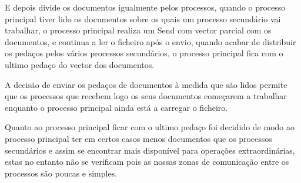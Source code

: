 \documentclass[times, 10pt,twocolumn]{article}
\begin{document}
E depois divide os documentos igualmente pelos processos, quando o processo principal tiver lido os documentos sobre os quais um processo secundário vai trabalhar, o processo principal realiza um Send com vector parcial com os documentos, e continua a ler o ficheiro após o envio, quando acabar de distribuir os pedaços pelos vários processos secundários, o processo principal fica com o ultimo pedaço do vector dos documentos.

A decisão de enviar os pedaços de documentos à medida que são lidos permite que os processos que recebem logo os seus documentos começarem a trabalhar enquanto o processo principal ainda está a carregar o ficheiro.

Quanto ao processo principal ficar com o ultimo pedaço foi decidido de modo ao processo principal ter em certos casos menos documentos que os processos secundários e assim se encontrar mais disponível para operações extraordinárias, estas no entanto não se verificam pois as nossas zonas de comunicação entre os processos são poucas e simples.

%
\end{document}
